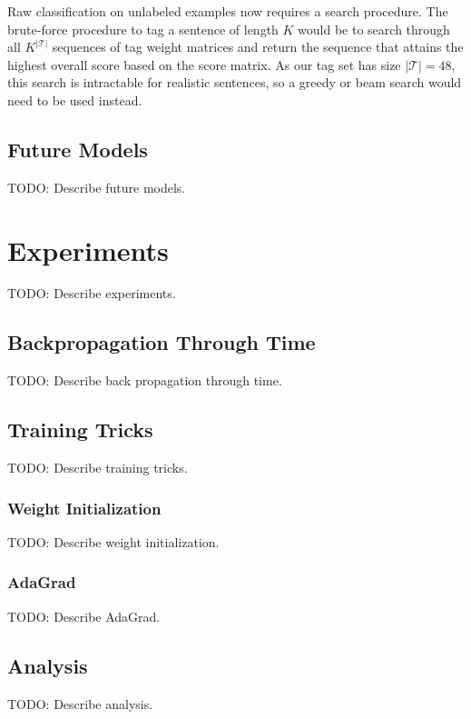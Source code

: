 \documentclass[11pt]{article}
\begin{document}
Raw classification on unlabeled examples now requires a search procedure. The brute-force procedure to tag a sentence of length $K$ would be to search through all $K^{\left\vert\mathcal{T}\right\vert}$ sequences of tag weight matrices and return the sequence that attains the highest overall score based on the score matrix. As our tag set has size $\left\vert\mathcal{T}\right\vert=48$, this search is intractable for realistic sentences, so a greedy or beam search would need to be used instead.

\subsection{Future Models}

TODO: Describe future models.

\section{Experiments}

TODO: Describe experiments.

\subsection{Backpropagation Through Time}

TODO: Describe back propagation through time.

\subsection{Training Tricks}

TODO: Describe training tricks.

\subsubsection{Weight Initialization}

TODO: Describe weight initialization.

\subsubsection{AdaGrad}

TODO: Describe AdaGrad.

\subsection{Analysis}

TODO: Describe analysis.
\end{document}
